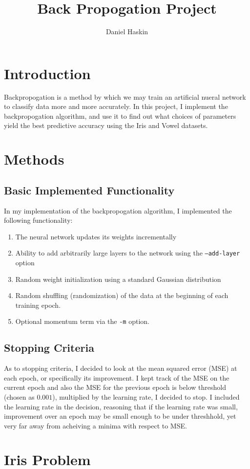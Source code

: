 \documentclass[12pt]{article}
\title{Back Propogation Project}
\author{Daniel Haskin}
\begin{document}
\maketitle
\section{Introduction}
Backpropogation is a method by which we may train an artificial nueral network
to classify data more and more accurately. In this project, I implement the
backpropogation algorithm, and use it to find out what choices of parameters
yield the best predictive accuracy using the Iris and Vowel datasets.
\section{Methods}
\subsection{Basic Implemented Functionality}
In my implementation of the backpropogation algorithm, I implemented
the following functionality:
\begin{enumerate}
\item The neural network updates its weights incrementally
\item Ability to add arbitrarily large layers to the network using the
    \texttt{--add-layer} option
\item Random weight initialization using a standard Gaussian distribution
\item Random shuffling (randomization) of the data at the beginning of each
    training epoch.
\item Optional momentum term via the \texttt{-m} option.
\end{enumerate}
\subsection{Stopping Criteria}
As to stopping criteria, I decided to look at the mean squared error (MSE) at
each epoch, or specifically its improvement. I kept track of the MSE on the
current epoch and also the MSE for the previous epoch is below threshold (chosen
as $0.001$), multiplied by the learning rate, I decided to stop. I included the
learning rate in the decision, reasoning that if the learning rate was small,
improvement over an epoch may be small enough to be under threshhold, yet very
far away from acheiving a minima with respect to MSE.
\section{Iris Problem}
\end{document}

